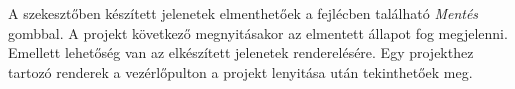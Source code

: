 A szekesztőben készített jelenetek elmenthetőek a fejlécben található \emph{Mentés} gombbal. A projekt következő megnyitásakor az elmentett állapot fog megjelenni. Emellett lehetőség van az elkészített jelenetek renderelésére. Egy projekthez tartozó renderek a vezérlőpulton a projekt lenyitása után tekinthetőek meg.